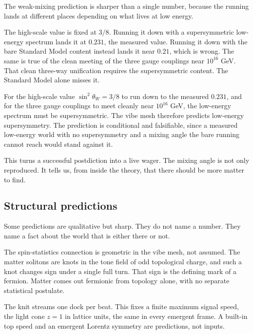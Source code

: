 The weak-mixing prediction is sharper than a single number, because the running lands at different places depending on what lives at low energy.

The high-scale value is fixed at $3/8$. Running it down with a supersymmetric low-energy spectrum lands it at $0.231$, the measured value. Running it down with the bare Standard Model content instead lands it near $0.21$, which is wrong. The same is true of the clean meeting of the three gauge couplings near $10^{16}$ GeV. That clean three-way unification requires the supersymmetric content. The Standard Model alone misses it.

\begin{proposition}
For the high-scale value $\sin^2\theta_W = 3/8$ to run down to the measured $0.231$, and for the three gauge couplings to meet cleanly near $10^{16}$ GeV, the low-energy spectrum must be supersymmetric. The vibe mesh therefore predicts low-energy supersymmetry. The prediction is conditional and falsifiable, since a measured low-energy world with no supersymmetry and a mixing angle the bare running cannot reach would stand against it.
\end{proposition}

This turns a successful postdiction into a live wager. The mixing angle is not only reproduced. It tells us, from inside the theory, that there should be more matter to find.

\subsection{Structural predictions}

Some predictions are qualitative but sharp. They do not name a number. They name a fact about the world that is either there or not.

\begin{result}
The spin-statistics connection is geometric in the vibe mesh, not assumed. The matter solitons are knots in the tone field of odd topological charge, and such a knot changes sign under a single full turn. That sign is the defining mark of a fermion. Matter comes out fermionic from topology alone, with no separate statistical postulate.
\end{result}

\begin{result}
The knit streams one dock per beat. This fixes a finite maximum signal speed, the light cone $z = 1$ in lattice units, the same in every emergent frame. A built-in top speed and an emergent Lorentz symmetry are predictions, not inputs.
\end{result}

